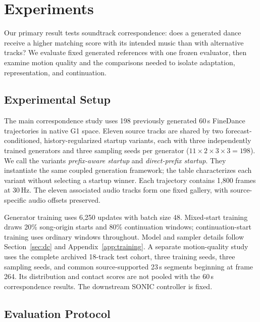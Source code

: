 \section{Experiments}
\label{sec:experiments}
Our primary result tests soundtrack correspondence: does a generated dance
receive a higher matching score with its intended music than with alternative
tracks? We evaluate fixed generated references with one frozen evaluator, then
examine motion quality and the comparisons needed to isolate adaptation,
representation, and continuation.

\subsection{Experimental Setup}
\label{sec:experimental_setup}
The main correspondence study uses 198 previously generated 60\,s FineDance
trajectories in native G1 space. Eleven source tracks are shared by two
forecast-conditioned, history-regularized startup variants, each with three
independently trained generators and three sampling seeds per generator
($11\times2\times3\times3=198$). We call the variants \emph{prefix-aware startup}
and \emph{direct-prefix startup}. They instantiate the same coupled generation
framework; the table characterizes each variant without selecting a startup winner.
Each trajectory contains 1,800 frames at 30\,Hz. The eleven associated audio
tracks form one fixed gallery, with source-specific audio offsets preserved.

Generator training uses 6,250 updates with batch size 48. Mixed-start training
draws 20\% song-origin starts and 80\% continuation windows; continuation-start
training uses ordinary windows throughout. Model and sampler details follow
Section~\ref{sec:dc} and Appendix~\ref{app:training}. A separate motion-quality
study uses the complete archived 18-track test cohort, three training seeds,
three sampling seeds, and common source-supported 23\,s segments beginning at
frame 264. Its distribution and contact scores are not pooled with the
60\,s correspondence results. The downstream SONIC controller is fixed.

\subsection{Evaluation Protocol}
\label{sec:evaluation_protocol}
